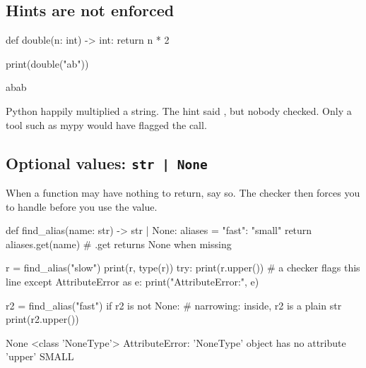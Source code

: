 \subsection{Hints are not enforced}

\begin{pycode}
def double(n: int) -> int:
    return n * 2

print(double("ab"))
\end{pycode}
\begin{rawcode}
abab
\end{rawcode}

Python happily multiplied a string. The hint said , but nobody checked. Only a tool such as mypy
would have flagged the call.

\subsection{Optional values: \texttt{str | None}}

When a function may have nothing to return, say so. The checker then forces you to handle 
before you use the value.

\begin{pycode}
def find_alias(name: str) -> str | None:
    aliases = {"fast": "small"}
    return aliases.get(name)          # .get returns None when missing

r = find_alias("slow")
print(r, type(r))
try:
    print(r.upper())                  # a checker flags this line
except AttributeError as e:
    print("AttributeError:", e)

r2 = find_alias("fast")
if r2 is not None:                    # narrowing: inside, r2 is a plain str
    print(r2.upper())
\end{pycode}
\begin{rawcode}
None <class 'NoneType'>
AttributeError: 'NoneType' object has no attribute 'upper'
SMALL
\end{rawcode}

